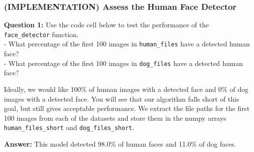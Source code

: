 \documentclass[11pt]{article}
\begin{document}
    \hypertarget{implementation-assess-the-human-face-detector}{%
\subsubsection{(IMPLEMENTATION) Assess the Human Face
Detector}\label{implementation-assess-the-human-face-detector}}

\textbf{Question 1:} Use the code cell below to test the performance of
the \texttt{face\_detector} function.\\
- What percentage of the first 100 images in \texttt{human\_files} have
a detected human face?\\
- What percentage of the first 100 images in \texttt{dog\_files} have a
detected human face?

Ideally, we would like 100\% of human images with a detected face and
0\% of dog images with a detected face. You will see that our algorithm
falls short of this goal, but still gives acceptable performance. We
extract the file paths for the first 100 images from each of the
datasets and store them in the numpy arrays \texttt{human\_files\_short}
and \texttt{dog\_files\_short}.

\textbf{Answer:} This model detected 98.0\% of human faces and 11.0\% of
dog faces.
\end{document}
